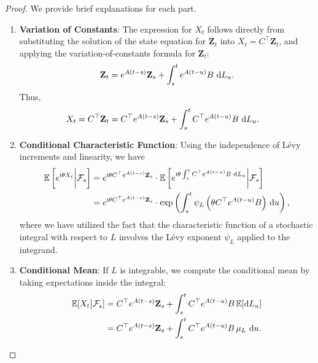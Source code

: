 \documentclass[10pt,a4paper,reqno]{amsart}
\theoremstyle{example}
\newcommand*\D{\mathop{}\!\textnormal{d}}
\newcommand*\I{\mathop{}\!\textnormal{i}}
\begin{document}
\begin{proof}
We provide brief explanations for each part.

\begin{enumerate}
    \item \textbf{Variation of Constants}: The expression for $X_t$ follows directly from substituting the solution of the state equation for $\mathbf{Z}_t$ into $X_t = C^\top \mathbf{Z}_t$, and applying the variation-of-constants formula for $\mathbf{Z}_t$:
    \begin{align*}
    \mathbf{Z}_t = e^{A (t - s)} \mathbf{Z}_s + \int_s^t e^{A (t - u)} B \, \D L_u.
    \end{align*}
    Thus,
    \begin{align*}
    X_t &= C^\top \mathbf{Z}_t = C^\top e^{A (t - s)} \mathbf{Z}_s + \int_s^t C^\top e^{A (t - u)} B \, \D L_u.
    \end{align*}
    
    \item \textbf{Conditional Characteristic Function}: Using the independence of L\'evy increments and linearity, we have
    \begin{align*}
    \mathbb{E}\left[ e^{\I \theta X_t} \bigg| \mathcal{F}_s \right] &= e^{ \I \theta C^\top e^{A (t - s)} \mathbf{Z}_s } \cdot \mathbb{E}\left[ e^{\I \theta \int_s^t C^\top e^{A (t - u)} B \, \D L_u } \bigg| \mathcal{F}_s \right] \\
    &= e^{ \I \theta C^\top e^{A (t - s)} \mathbf{Z}_s } \cdot \exp\left( \int_s^t \psi_L\left( \theta C^\top e^{A (t - u)} B \right) \, \D u \right),
    \end{align*}
    where we have utilized the fact that the characteristic function of a stochastic integral with respect to $L$ involves the L\'evy exponent $\psi_L$ applied to the integrand.
    
    \item \textbf{Conditional Mean}: If $L$ is integrable, we compute the conditional mean by taking expectations inside the integral:
    \begin{align*}
    \mathbb{E}[ X_t \big| \mathcal{F}_s ] &= C^\top e^{A (t - s)} \mathbf{Z}_s + \int_s^t C^\top e^{A (t - u)} B \, \mathbb{E}[ \D L_u ] \\
    &= C^\top e^{A (t - s)} \mathbf{Z}_s + \int_s^t C^\top e^{A (t - u)} B \, \mu_L \, \D u.
    \end{align*}
    

\end{enumerate}
\end{proof}
\end{document}

